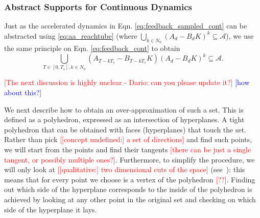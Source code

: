 \documentclass[twocolumn]{autart}    %
\newcommand{\mat}[1]{{#1}}
\renewcommand{\note}[1]{\textcolor{red}{[#1]}}
\begin{document}
 \subsubsection{Abstract Supports for Continuous Dynamics}
 \label{sec:cont_aasup}

Just as the accelerated dynamics in Eqn. \eqref{eq:feedback_sampled_cont} can be abstracted using \eqref{eq:aa_reachtube} (where $\bigcup_{k \in N_0} (\mat{A}_d-\mat{B}_d\mat{K}) ^k \subseteq \mathcal{A}$), 
we use the same principle on Eqn. \eqref{eq:feedback_cont} to obtain 
\begin{equation}\label{eq:aa_cont_amatrix}
\bigcup_{T \in [0, T_s], k \in N_0} (\mat{A}_{T-kT_s}-\mat{B}_{T-kT_s}\mat{K}) (\mat{A}_d-\mat{B}_d\mat{K})^k \subseteq \mathcal{A}.
\end{equation}

\textcolor{red}{[The next discussion is highly unclear - Dario: can you please update it?]}
\textcolor{blue}{[how about this?]}

We next describe how to obtain an over-approximation of such a set. 
This is defined as a polyhedron, expressed as an intersection of hyperplanes. 
A tight polyhedron that can be obtained with faces (hyperplanes) that touch the set. 
Rather than pick \note{[concept undefined:] a set of directions} and find such points, 
we will start from the points and find their tangents \note{there can be just a single tangent, or possibly multiple ones?}.  
Furthermore, to simplify the procedure, 
we will only look at \note{[qualitative:] two dimensional cuts of the space}  
(see~\cite{cattaruzza2015unbounded}):  
this means that for every point we choose is a vertex of the polyhedron \note{??}. 
Finding out which side of the hyperplane corresponds to the inside of the
polyhedron is achieved by looking at any other point in the original set and
checking on which side of the hyperplane it lays.

\end{document}
